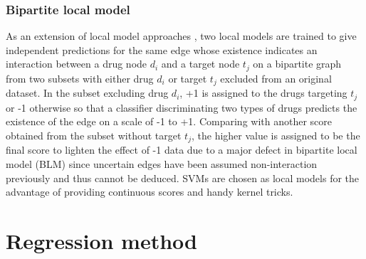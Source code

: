 \documentclass[a4paper,12pt]{report}
\begin{document}
\subsubsection{Bipartite local model}

As an extension of local model approaches \citep{ble07, mor08}, two local models are trained to give independent predictions for the same edge whose existence indicates an interaction between a drug node $d_i$ and a target node $t_j$ on a bipartite graph from two subsets with either drug $d_i$ or target $t_j$ excluded from an original dataset\citep{ble09}. In the subset excluding drug $d_i$, +1 is assigned to the drugs targeting $t_j$ or -1 otherwise so that a classifier discriminating two types of drugs predicts the existence of the edge on a scale of -1 to +1. Comparing with another score obtained from the subset without target $t_j$, the higher value is assigned to be the final score to lighten the effect of -1 data due to a major defect in bipartite local model (BLM) since uncertain edges have been assumed non-interaction previously and thus cannot be deduced. SVMs are chosen as local models for the advantage of providing continuous scores and handy kernel tricks.

\section{Regression method}
\end{document}
